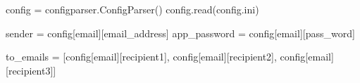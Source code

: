 \documentclass[
  letterpaper,
  DIV=11,
  numbers=noendperiod]{scrreprt}
\newenvironment{Shaded}{\begin{snugshade}}{\end{snugshade}}
\newcommand{\NormalTok}[1]{\textcolor[rgb]{0.00,0.23,0.31}{#1}}
\newcommand{\OperatorTok}[1]{\textcolor[rgb]{0.37,0.37,0.37}{#1}}
\newcommand{\StringTok}[1]{\textcolor[rgb]{0.13,0.47,0.30}{#1}}
\begin{document}
\begin{Shaded}
\begin{Highlighting}[]
\NormalTok{config }\OperatorTok{=}\NormalTok{ configparser.ConfigParser()}
\NormalTok{config.read(}\StringTok{\textquotesingle{}config.ini\textquotesingle{}}\NormalTok{)}

\NormalTok{sender }\OperatorTok{=}\NormalTok{ config[}\StringTok{\textquotesingle{}email\textquotesingle{}}\NormalTok{][}\StringTok{\textquotesingle{}email\_address\textquotesingle{}}\NormalTok{]}
\NormalTok{app\_password }\OperatorTok{=}\NormalTok{ config[}\StringTok{\textquotesingle{}email\textquotesingle{}}\NormalTok{][}\StringTok{\textquotesingle{}pass\_word\textquotesingle{}}\NormalTok{]}

\NormalTok{to\_emails }\OperatorTok{=}\NormalTok{ [config[}\StringTok{\textquotesingle{}email\textquotesingle{}}\NormalTok{][}\StringTok{\textquotesingle{}recipient1\textquotesingle{}}\NormalTok{], config[}\StringTok{\textquotesingle{}email\textquotesingle{}}\NormalTok{][}\StringTok{\textquotesingle{}recipient2\textquotesingle{}}\NormalTok{],}
\NormalTok{config[}\StringTok{\textquotesingle{}email\textquotesingle{}}\NormalTok{][}\StringTok{\textquotesingle{}recipient3\textquotesingle{}}\NormalTok{]]}
\end{Highlighting}
\end{Shaded}
\end{document}
